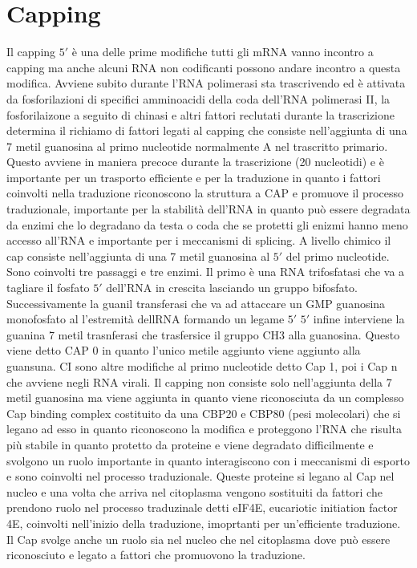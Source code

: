 \section{Capping}
Il capping $5'$ \`e una delle prime modifiche tutti gli mRNA vanno incontro a capping ma anche alcuni RNA non codificanti possono andare incontro a questa modifica. Avviene subito
durante l'RNA polimerasi sta trascrivendo ed \`e attivata da fosforilazioni di specifici amminoacidi della coda dell'RNA polimerasi II, la fosforilaizone a seguito di chinasi e altri
fattori reclutati durante la trascrizione determina il richiamo di fattori legati al capping che consiste nell'aggiunta di una 7 metil guanosina al primo nucleotide normalmente A nel
trascritto primario. Questo avviene in maniera precoce durante la trascrizione (20 nucleotidi) e \`e importante per un trasporto efficiente e per la traduzione in quanto i fattori 
coinvolti nella traduzione riconoscono la struttura a CAP e promuove il processo traduzionale, importante per la stabilit\`a dell'RNA in quanto pu\`o essere degradata da enzimi che lo 
degradano da testa o coda che se protetti gli enizmi hanno meno accesso all'RNA e importante per i meccanismi di splicing. A livello chimico il cap consiste nell'aggiunta di una 7 metil
guanosina al $5'$ del primo nucleotide. Sono coinvolti tre passaggi e tre enzimi. Il primo \`e una RNA trifosfatasi che va a tagliare il fosfato $5'$ dell'RNA in crescita lasciando un
gruppo bifosfato. Successivamente la guanil transferasi che va ad attaccare un GMP guanosina monofosfato al l'estremit\`a dellRNA formando un legame $5'$ $5'$ infine interviene la 
guanina 7 metil trasnferasi che trasfersice il gruppo CH3 alla guanosina. Questo viene detto CAP $0$ in quanto l'unico metile aggiunto viene aggiunto alla guansuna. CI sono 
altre modifiche al primo nucleotide detto Cap 1, poi i Cap n che avviene negli RNA virali. Il capping non consiste solo nell'aggiunta della 7 metil guanosina ma viene aggiunta in quanto
viene riconosciuta da un complesso Cap binding complex costituito da una CBP20 e CBP80 (pesi molecolari) che si legano ad esso in quanto riconoscono la modifica e proteggono l'RNA che 
risulta pi\`u stabile in quanto protetto da proteine e viene degradato difficilmente e svolgono un ruolo importante in quanto interagiscono con i meccanismi di esporto e sono coinvolti
nel processo traduzionale. Queste proteine si legano al Cap nel nucleo e una volta che arriva nel citoplasma vengono sostituiti da fattori che prendono ruolo nel processo traduzinale
detti eIF4E, eucariotic initiation factor 4E, coinvolti nell'inizio della traduzione, imoprtanti per un'efficiente traduzione. Il Cap svolge anche un ruolo sia nel nucleo che nel 
citoplasma dove pu\`o essere riconosciuto e legato a fattori che promuovono la traduzione.
